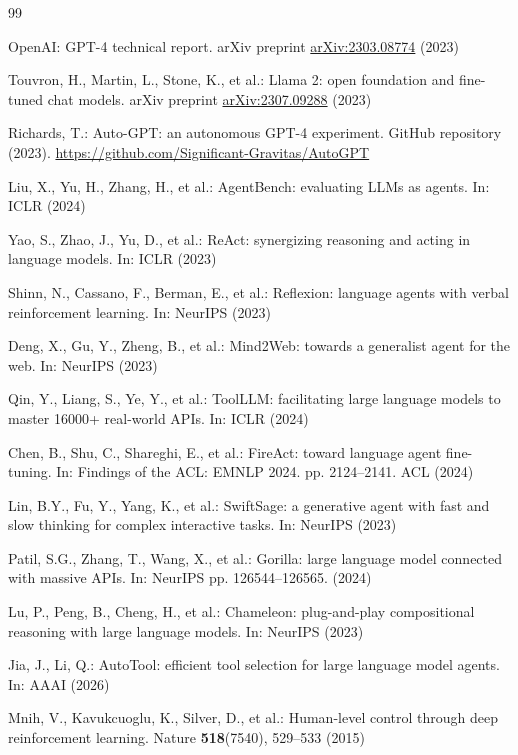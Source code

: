 \documentclass[runningheads]{llncs}
\begin{document}
\begin{thebibliography}{99}

OpenAI: GPT-4 technical report. arXiv preprint \href{https://arxiv.org/abs/2303.08774}{arXiv:2303.08774} (2023)

Touvron, H., Martin, L., Stone, K., et al.: Llama 2: open foundation and fine-tuned chat models. arXiv preprint \href{https://arxiv.org/abs/2307.09288}{arXiv:2307.09288} (2023)

Richards, T.: Auto-GPT: an autonomous GPT-4 experiment. GitHub repository (2023). \url{https://github.com/Significant-Gravitas/AutoGPT}

Liu, X., Yu, H., Zhang, H., et al.: AgentBench: evaluating LLMs as agents. In: ICLR (2024)

Yao, S., Zhao, J., Yu, D., et al.: ReAct: synergizing reasoning and acting in language models. In: ICLR (2023)

Shinn, N., Cassano, F., Berman, E., et al.: Reflexion: language agents with verbal reinforcement learning. In: NeurIPS (2023)

Deng, X., Gu, Y., Zheng, B., et al.: Mind2Web: towards a generalist agent for the web. In: NeurIPS (2023)

Qin, Y., Liang, S., Ye, Y., et al.: ToolLLM: facilitating large language models to master 16000+ real-world APIs. In: ICLR (2024)

Chen, B., Shu, C., Shareghi, E., et al.: FireAct: toward language agent fine-tuning. In: Findings of the ACL: EMNLP 2024. pp. 2124--2141. ACL (2024)

Lin, B.Y., Fu, Y., Yang, K., et al.: SwiftSage: a generative agent with fast and slow thinking for complex interactive tasks. In: NeurIPS (2023)

Patil, S.G., Zhang, T., Wang, X., et al.: Gorilla: large language model connected with massive APIs. In: NeurIPS pp. 126544--126565. (2024)

Lu, P., Peng, B., Cheng, H., et al.: Chameleon: plug-and-play compositional reasoning with large language models. In: NeurIPS (2023)

Jia, J., Li, Q.: AutoTool: efficient tool selection for large language model agents. In: AAAI (2026)

Mnih, V., Kavukcuoglu, K., Silver, D., et al.: Human-level control through deep reinforcement learning. Nature \textbf{518}(7540), 529--533 (2015)


\end{thebibliography}
\end{document}
